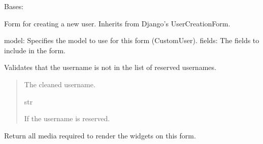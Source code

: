 \documentclass[letterpaper,10pt,english]{sphinxmanual}
\begin{document}
\begin{fulllineitems}
\label{\detokenize{modules/forms:account.forms.CustomUserCreationForm}}
\pysigstartsignatures
{}
\pysigstopsignatures
\sphinxAtStartPar
Bases: 

\sphinxAtStartPar
Form for creating a new user. Inherits from Django’s UserCreationForm.
\begin{description}
\sphinxAtStartPar
model: Specifies the model to use for this form (CustomUser).
fields: The fields to include in the form.

\end{description}

\begin{fulllineitems}
\label{\detokenize{modules/forms:account.forms.CustomUserCreationForm.clean_username}}
\pysigstartsignatures
{}
\pysigstopsignatures
\sphinxAtStartPar
Validates that the username is not in the list of reserved usernames.
\begin{quote}\begin{description}
\sphinxAtStartPar
The cleaned username.

\sphinxAtStartPar
str

\sphinxAtStartPar
{} \textendash{} If the username is reserved.

\end{description}\end{quote}

\end{fulllineitems}


\begin{fulllineitems}
\label{\detokenize{modules/forms:account.forms.CustomUserCreationForm.media}}
\pysigstartsignatures
{}
\pysigstopsignatures
\sphinxAtStartPar
Return all media required to render the widgets on this form.

\end{fulllineitems}


\end{fulllineitems}
\end{document}
